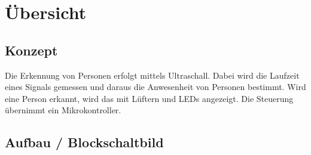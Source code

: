 



\section{Übersicht}

\subsection{Konzept}
Die Erkennung von Personen erfolgt mittels Ultraschall. Dabei wird die Laufzeit 
eines Signals gemessen und daraus die Anwesenheit von Personen bestimmt. Wird 
eine Person erkannt, wird das mit Lüftern und LEDs angezeigt. Die Steuerung 
übernimmt ein Mikrokontroller. 

\subsection{Aufbau / Blockschaltbild}
